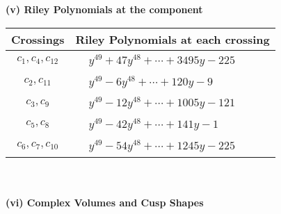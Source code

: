 \documentclass[1p]{elsarticle_modified}
\theoremstyle{definition}
\begin{document}
\newpage\renewcommand{\arraystretch}{1}
\flushleft \textbf{(v) Riley Polynomials at the component}\newline \\
\begin{tabular}{m{50pt}|m{274pt}}
Crossings & \hspace{64pt}Riley Polynomials at each crossing \\
\hline $$\begin{aligned}c_{1},c_{4},c_{12}\end{aligned}$$&$\begin{aligned}
&y^{49}+47 y^{48}+\cdots+3495 y-225
\end{aligned}$\\
\hline $$\begin{aligned}c_{2},c_{11}\end{aligned}$$&$\begin{aligned}
&y^{49}-6 y^{48}+\cdots+120 y-9
\end{aligned}$\\
\hline $$\begin{aligned}c_{3},c_{9}\end{aligned}$$&$\begin{aligned}
&y^{49}-12 y^{48}+\cdots+1005 y-121
\end{aligned}$\\
\hline $$\begin{aligned}c_{5},c_{8}\end{aligned}$$&$\begin{aligned}
&y^{49}-42 y^{48}+\cdots+141 y-1
\end{aligned}$\\
\hline $$\begin{aligned}c_{6},c_{7},c_{10}\end{aligned}$$&$\begin{aligned}
&y^{49}-54 y^{48}+\cdots+1245 y-225
\end{aligned}$\\
\hline
\end{tabular}\\~\\
\newpage\flushleft \textbf{(vi) Complex Volumes and Cusp Shapes}
\end{document}

